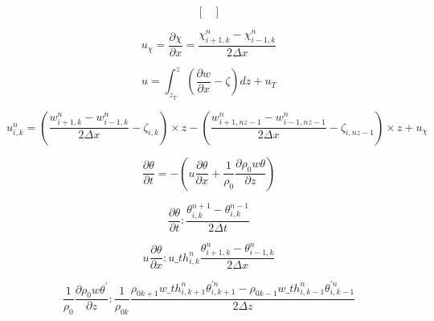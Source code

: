 \documentclass[a4paper,fleqn,10pt]{report}
\begin{document}
\begin{CJK*}{UTF8}{bsmi}
\begin{equation*}
\begin{bmatrix}
\end{bmatrix}
\end{equation*}

\newpage

\begin{equation*}
u_{\chi} = \frac{\partial \chi}{\partial x} = \frac{\chi^{n}_{i+1,k} - \chi^{n}_{i-1,k}}{2\Delta x}
\end{equation*}

\begin{equation*}
u = \int_{z_{T}}^{z}(\frac{\partial w}{\partial x} - \zeta)dz + u_{T}
\end{equation*}

\begin{equation*}
u^{n}_{i,k} = (\frac{w^{n}_{i+1,k} - w^{n}_{i-1,k}}{2\Delta x}-\zeta_{i,k})\times z - (\frac{w^{n}_{i+1,nz-1} - w^{n}_{i-1,nz-1}}{2\Delta x}-\zeta_{i,nz-1})\times z + u_{\chi}
\end{equation*}

\begin{equation*}
\frac{\partial \theta}{\partial t} = -(u\frac{\partial \theta}{\partial x} + \frac{1}{\rho_{0}}\frac{\partial\rho_{0} w \theta}{\partial z}) 
\end{equation*}

\begin{equation*}
\frac{\partial \theta}{\partial t}: \frac{\theta^{n+1}_{i,k} - \theta^{n-1}_{i,k}}{2\Delta t}
\end{equation*}

\begin{equation*}
u \frac{\partial\theta}{\partial x}: u\_th^{n}_{i,k}\frac{\theta^{n}_{i+1,k} - \theta^{n}_{i-1,k}}{2\Delta x}
\end{equation*}

\begin{equation*}
\frac{1}{\rho_{0}}\frac{\partial \rho_{0}w\theta^{'}}{\partial z}: \frac{1}{\rho_{0k}}\frac{\rho_{0k+1}w\_th^{n}_{i,k+1}\theta^{'n}_{i,k+1} - \rho_{0k-1}w\_th^{n}_{i,k-1}\theta^{'n}_{i,k-1}}{2\Delta z}
\end{equation*}


\end{CJK*}
\end{document}
